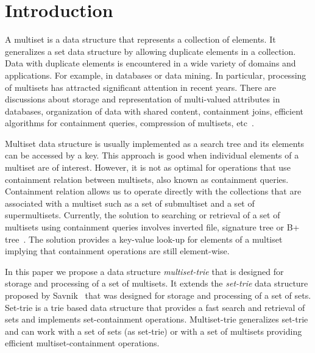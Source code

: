 \section{Introduction} \label{c:introduction}
%
%
A multiset is a data structure that represents a collection of elements. It generalizes a set data structure 
by allowing duplicate elements in a collection. 
%
Data with duplicate elements is encountered in a wide variety of domains and applications. For example, 
in databases or data mining. In particular, processing of multisets has attracted significant attention in 
recent years. 
%
There are discussions about storage and representation of multi-valued attributes in databases, organization 
of data with shared content, containment joins, efficient algorithms for containment queries, compression 
of multisets, etc~\cite{bouros2016set,gripon2012compressing,ross2004symmetric,steinruecken2015compressing}.

Multiset data structure is usually implemented as a search tree and its elements can be accessed by a key. 
%
This approach is good when individual elements of a multiset are of interest. However, it is not as optimal for operations 
that use containment relation between multisets, also known as containment queries. 
%
Containment relation allows us to operate directly with the collections that are associated with a multiset such as a set 
of submultiset and a set of supermultisets.
%
Currently, the solution to searching or retrieval of a set of multisets using containment queries involves inverted file, 
signature tree or B+ tree~\cite{Helmer2003}. The solution provides a key-value look-up for elements of a multiset implying that 
containment operations are still element-wise.


%
In this paper we propose a data structure \emph{multiset-trie} that is designed for storage and 
processing of a set of multisets. It extends the \emph{set-trie} data structure proposed by 
Savnik~\cite{savnik2013index} that was designed for storage and processing of a set of sets. 
%
Set-trie is a trie based data structure that provides a fast search and retrieval of sets and implements 
set-containment operations. 
%
Multiset-trie generalizes set-trie and can work with a set of sets (as set-trie) or with 
a set of multisets providing efficient multiset-containment operations.


